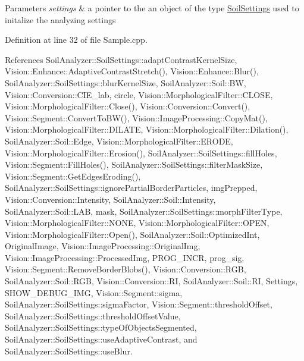 \begin{DoxyParams}{Parameters}
{\em settings} & a pointer to the an object of the type \hyperlink{class_soil_analyzer_1_1_soil_settings}{Soil\+Settings} used to initalize the analyzing settings \\
\hline
\end{DoxyParams}


Definition at line 32 of file Sample.\+cpp.



References Soil\+Analyzer\+::\+Soil\+Settings\+::adapt\+Contrast\+Kernel\+Size, Vision\+::\+Enhance\+::\+Adaptive\+Contrast\+Stretch(), Vision\+::\+Enhance\+::\+Blur(), Soil\+Analyzer\+::\+Soil\+Settings\+::blur\+Kernel\+Size, Soil\+Analyzer\+::\+Soil\+::\+B\+W, Vision\+::\+Conversion\+::\+C\+I\+E\+\_\+lab, circle, Vision\+::\+Morphological\+Filter\+::\+C\+L\+O\+S\+E, Vision\+::\+Morphological\+Filter\+::\+Close(), Vision\+::\+Conversion\+::\+Convert(), Vision\+::\+Segment\+::\+Convert\+To\+B\+W(), Vision\+::\+Image\+Processing\+::\+Copy\+Mat(), Vision\+::\+Morphological\+Filter\+::\+D\+I\+L\+A\+T\+E, Vision\+::\+Morphological\+Filter\+::\+Dilation(), Soil\+Analyzer\+::\+Soil\+::\+Edge, Vision\+::\+Morphological\+Filter\+::\+E\+R\+O\+D\+E, Vision\+::\+Morphological\+Filter\+::\+Erosion(), Soil\+Analyzer\+::\+Soil\+Settings\+::fill\+Holes, Vision\+::\+Segment\+::\+Fill\+Holes(), Soil\+Analyzer\+::\+Soil\+Settings\+::filter\+Mask\+Size, Vision\+::\+Segment\+::\+Get\+Edges\+Eroding(), Soil\+Analyzer\+::\+Soil\+Settings\+::ignore\+Partial\+Border\+Particles, img\+Prepped, Vision\+::\+Conversion\+::\+Intensity, Soil\+Analyzer\+::\+Soil\+::\+Intensity, Soil\+Analyzer\+::\+Soil\+::\+L\+A\+B, mask, Soil\+Analyzer\+::\+Soil\+Settings\+::morph\+Filter\+Type, Vision\+::\+Morphological\+Filter\+::\+N\+O\+N\+E, Vision\+::\+Morphological\+Filter\+::\+O\+P\+E\+N, Vision\+::\+Morphological\+Filter\+::\+Open(), Soil\+Analyzer\+::\+Soil\+::\+Optimized\+Int, Original\+Image, Vision\+::\+Image\+Processing\+::\+Original\+Img, Vision\+::\+Image\+Processing\+::\+Processed\+Img, P\+R\+O\+G\+\_\+\+I\+N\+C\+R, prog\+\_\+sig, Vision\+::\+Segment\+::\+Remove\+Border\+Blobs(), Vision\+::\+Conversion\+::\+R\+G\+B, Soil\+Analyzer\+::\+Soil\+::\+R\+G\+B, Vision\+::\+Conversion\+::\+R\+I, Soil\+Analyzer\+::\+Soil\+::\+R\+I, Settings, S\+H\+O\+W\+\_\+\+D\+E\+B\+U\+G\+\_\+\+I\+M\+G, Vision\+::\+Segment\+::sigma, Soil\+Analyzer\+::\+Soil\+Settings\+::sigma\+Factor, Vision\+::\+Segment\+::threshold\+Offset, Soil\+Analyzer\+::\+Soil\+Settings\+::threshold\+Offset\+Value, Soil\+Analyzer\+::\+Soil\+Settings\+::type\+Of\+Objects\+Segmented, Soil\+Analyzer\+::\+Soil\+Settings\+::use\+Adaptive\+Contrast, and Soil\+Analyzer\+::\+Soil\+Settings\+::use\+Blur.



